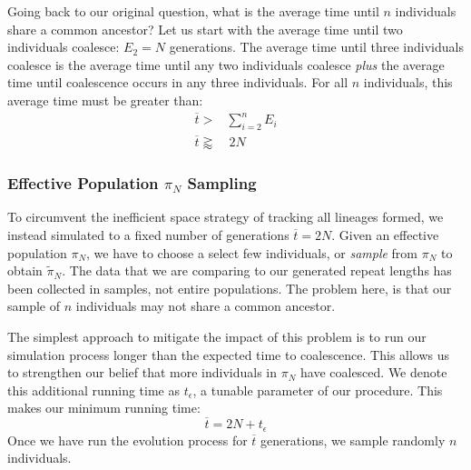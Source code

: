Going back to our original question, what is the average time until $n$ individuals share a common ancestor?
Let us start with the average time until two individuals coalesce: $E_2 = N$ generations.
The average time until three individuals coalesce is the average time until any two individuals coalesce \emph{plus} the
average time until coalescence occurs in any three individuals.
For all $n$ individuals, this average time must be greater than:
\begin{equation}
    \begin{aligned}
        \overbar{t} >& \sum_{i=2}^{n} E_i \\
        \overbar{t} \gtrapprox& \ 2N
    \end{aligned}
\end{equation}

\subsubsection{Effective Population $\pi_N$ Sampling}
To circumvent the inefficient space strategy of tracking all lineages formed, we instead simulated to a fixed number
of generations $\overbar{t} = 2N$.
Given an effective population $\pi_N$, we have to choose a select few individuals, or \emph{sample} from $\pi_N$ to
obtain $\tilde{\pi}_N$.
The data that we are comparing to our generated repeat lengths has been collected in samples, not entire populations.
The problem here, is that our sample of $n$ individuals may not share a common ancestor.

The simplest approach to mitigate the impact of this problem is to run our simulation process longer than the expected
time to coalescence.
This allows us to strengthen our belief that more individuals in $\pi_N$ have coalesced.
We denote this additional running time as $t_\epsilon$, a tunable parameter of our procedure.
This makes our minimum running time:
\begin{equation}
    \overbar{t} = 2N + t_\epsilon
\end{equation}
Once we have run the evolution process for $\overbar{t}$ generations, we sample randomly $n$ individuals.

